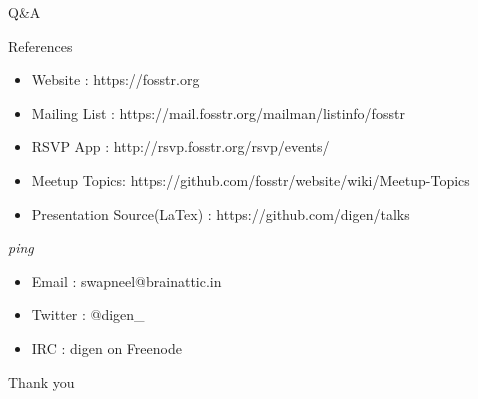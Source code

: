\documentclass{beamer}
\begin{document}
\begin{frame}{}
\begin{center}
Q\&A
\end{center}
\end{frame}

\begin{frame}{References}
\begin{center}
\begin{itemize}
\item Website : https://fosstr.org
\item Mailing List : https://mail.fosstr.org/mailman/listinfo/fosstr
\item RSVP App : http://rsvp.fosstr.org/rsvp/events/
\item Meetup Topics: https://github.com/fosstr/website/wiki/Meetup-Topics
\item Presentation Source(LaTex) : https://github.com/digen/talks
\end{itemize}
\end{center}
\end{frame}


\begin{frame}{\textit{ping }}
\begin{itemize}
\item Email : {swapneel@brainattic.in}
\item Twitter : @digen\_
\item IRC   : digen on Freenode
\end{itemize}
\end{frame}



\begin{frame}{}
\begin{center}
Thank you
\end{center}
\end{frame}
\end{document}
